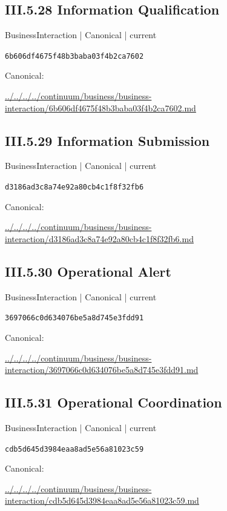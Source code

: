 \documentclass[10pt,a4paper]{article}
\begin{document}
\subsection*{III.5.28 Information Qualification}
\label{element-6b606df4675f48b3baba03f4b2ca7602}
{\small BusinessInteraction | Canonical | current}\par
\texttt{6b606df4675f48b3baba03f4b2ca7602}\par
Canonical: \par
{\footnotesize\url{../../../../continuum/business/business-interaction/6b606df4675f48b3baba03f4b2ca7602.md}}\par
\subsection*{III.5.29 Information Submission}
\label{element-d3186ad3c8a74e92a80cb4c1f8f32fb6}
{\small BusinessInteraction | Canonical | current}\par
\texttt{d3186ad3c8a74e92a80cb4c1f8f32fb6}\par
Canonical: \par
{\footnotesize\url{../../../../continuum/business/business-interaction/d3186ad3c8a74e92a80cb4c1f8f32fb6.md}}\par
\subsection*{III.5.30 Operational Alert}
\label{element-3697066c0d634076be5a8d745e3fdd91}
{\small BusinessInteraction | Canonical | current}\par
\texttt{3697066c0d634076be5a8d745e3fdd91}\par
Canonical: \par
{\footnotesize\url{../../../../continuum/business/business-interaction/3697066c0d634076be5a8d745e3fdd91.md}}\par
\subsection*{III.5.31 Operational Coordination}
\label{element-cdb5d645d3984eaa8ad5e56a81023c59}
{\small BusinessInteraction | Canonical | current}\par
\texttt{cdb5d645d3984eaa8ad5e56a81023c59}\par
Canonical: \par
{\footnotesize\url{../../../../continuum/business/business-interaction/cdb5d645d3984eaa8ad5e56a81023c59.md}}\par
\end{document}

